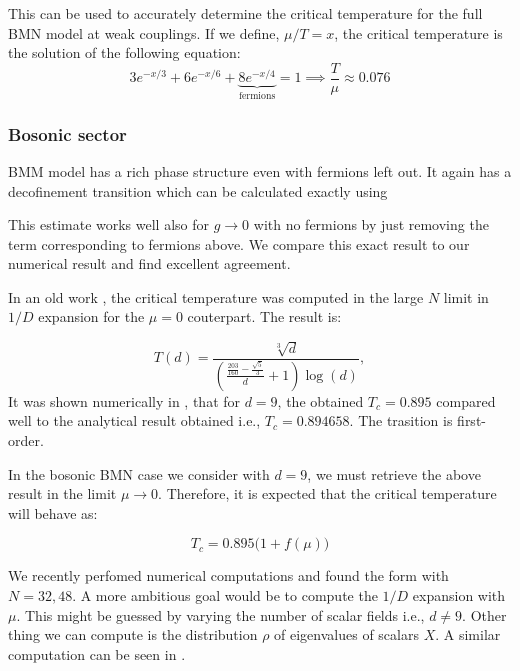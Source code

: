 \documentclass[11pt]{article}
\begin{document}
This can be used to accurately determine the critical temperature for the full BMN model at weak couplings. If we define, $\mu/T = x$, the critical temperature is the solution of the following equation:
\begin{equation}
	3e^{-x/3} + 6e^{-x/6} + \underbrace{8e^{-x/4}}_{\text{fermions}}= 1 \implies \frac{T}{\mu} \approx 0.076
\end{equation}


\subsubsection{Bosonic sector}


BMM model has a rich phase structure even with fermions left out. 
It again has a decofinement transition which can be calculated exactly using 


 
This estimate works well also for $ g \to 0$ with no fermions by just removing the term corresponding to fermions above. We compare this exact result to our numerical result and find excellent agreement. 



In an old work \cite{Mandal:2009vz}, the critical temperature was computed in the large $N$ limit in $1/D$ expansion for the $\mu=0$ couterpart. The result is:

\begin{equation}
T(d) = \frac{\sqrt[3]{d}}{\left(\frac{\frac{203}{160}-\frac{\sqrt{5}}{3}}{d}+1\right) \log (d)}, 
\end{equation}
It was shown numerically in \cite{Bergner:2019rca}, that for $d = 9$, the obtained $T_{c} = 0.895$ compared well to the analytical result obtained i.e., $T_{c} = 0.894658$. The trasition is first-order. 

In the bosonic BMN case we consider with $d=9$, we must retrieve the above result in the limit $ \mu \to 0$. Therefore, it is expected that the critical temperature will behave as:

\begin{equation}
T_{c} = 0.895 \Big( 1 + f(\mu) \Big)
\end{equation}

We recently perfomed numerical computations and found the form with $N=32,48$. A more ambitious goal would be to compute the $1/D$ expansion with $\mu$. This might be guessed by varying the number of scalar fields i.e., $d \neq 9$. Other thing we can compute is the distribution $\rho$ of eigenvalues of scalars $X$. 
A similar computation can be seen in \cite{Filev:2015hia}. 
 
\end{document}
